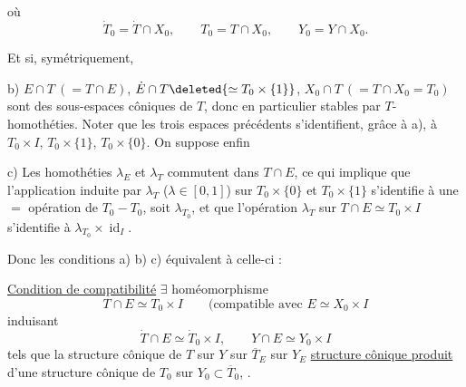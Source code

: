 où
\[
\dot T_0=\dot T\cap X_0,\qquad
T_0=T\cap X_0,\qquad
Y_0=Y\cap X_0.
\]

Et si, symétriquement,

b) $E\cap T\ (=T\cap E)$, $\dot E\cap T\deleted{\simeq T_0\times\{1\}}$,
$X_0\cap T\ (=T\cap X_0=T_0)$ sont des
sous-espaces côniques de $T$, donc en particulier
stables par $T$-homothéties.  Noter que
les trois espaces précédents s'identifient, grâce à a),
à $T_0\times I$, $T_0\times\{1\}$, $T_0\times\{0\}$. On suppose enfin

c) Les homothéties  $\lambda_E$ et $\lambda_T$ commutent
dans $T\cap E$, ce qui implique que l'application
\deleted{$\unsure{\lambda}$} induite par $\lambda_T$ ($\lambda\in[0,1]$) sur
$T_0\times\{0\}$ et $T_0\times\{1\}$
s'identifie à une $=$  opération de
$T_0-T_0$,  soit $\lambda_{T_0}$, et que l'opération
$\lambda_T$ sur $T\cap E\simeq T_0\times I$ s'identifie à
 $\lambda_{T_0}\times\operatorname{id}_I$.

Donc les conditions a) b) c) équivalent à celle-ci :

\uline{Condition de compatibilité} $\exists$ homéomorphisme
\[
T\cap E\simeq T_0\times I
\qquad\text{(compatible avec }E\simeq X_0\times I
\]
induisant
\[
\dot T\cap E\simeq\dot T_0\times I,\qquad Y\cap E\simeq Y_0\times I
\]
tels que la structure cônique de $T$ sur $Y$
 sur $\overline T_E$ sur $Y_E$
 
\uline{structure cônique produit} 
d'une structure cônique de
$T_0$ sur $Y_0\subset\overline T_0$, .
